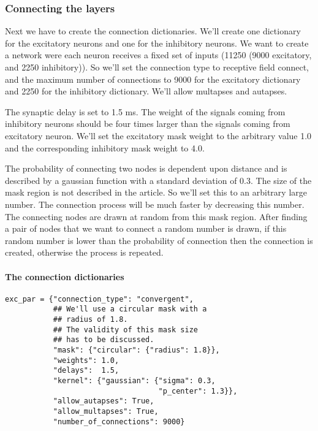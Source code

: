 \documentclass{article}
\begin{document}
\subsubsection{Connecting the layers}

Next we have to create the connection dictionaries. We'll create one dictionary for the excitatory neurons and one for the inhibitory neurons. We want to create a network were each neuron receives a fixed set of inputs (11250 (9000 excitatory, and 2250 inhibitory)). So we'll set the connection type to receptive field connect, and the maximum number of connections to 9000 for the excitatory dictionary and 2250 for the inhibitory dictionary. We'll allow multapses and autapses. 

The synaptic delay is set to 1.5 ms. The weight of the signals coming from inhibitory neurons should be four times larger than the signals coming from excitatory neuron. We'll set the excitatory mask weight to the arbitrary value 1.0 and the corresponding inhibitory mask weight to 4.0. 

The probability of connecting two nodes is dependent upon distance and is described by a gaussian function with a standard deviation of 0.3. The size of the mask region is not described in the article. So we'll set this to an arbitrary large number. The connection process will be much faster by decreasing this number. The connecting nodes are drawn at random from this mask region. After finding a pair of nodes that we want to connect a random number is drawn, if this random number is lower than the probability of connection then the connection is created, otherwise the process is repeated. 

\paragraph{The connection dictionaries}

\begin{verbatim}
exc_par = {"connection_type": "convergent",
           ## We'll use a circular mask with a
           ## radius of 1.8.
           ## The validity of this mask size
           ## has to be discussed.
           "mask": {"circular": {"radius": 1.8}},
           "weights": 1.0,
           "delays":  1.5,
           "kernel": {"gaussian": {"sigma": 0.3,
                                   "p_center": 1.3}},
           "allow_autapses": True,
           "allow_multapses": True,
           "number_of_connections": 9000}
\end{verbatim}
\end{document}
